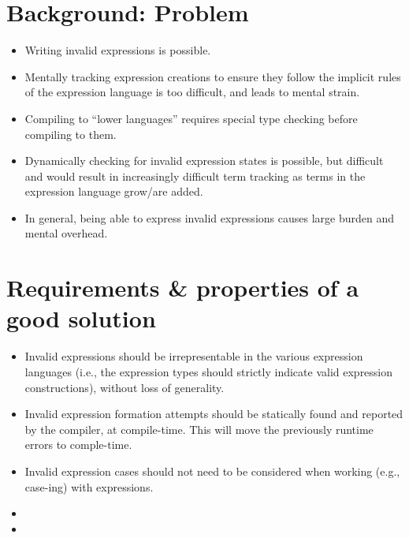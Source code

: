 \section{Background: Problem}

\begin{itemize}
    
    \item Writing invalid expressions is possible.
    
    \item Mentally tracking expression creations to ensure they follow
          the implicit rules of the expression language is too difficult,
          and leads to mental strain.

    \item Compiling to ``lower languages'' requires special type checking
          before compiling to them. 
    
    \item Dynamically checking for invalid expression states is possible,
          but difficult and would result in increasingly difficult term
          tracking as terms in the expression language grow/are added.

    \item In general, being able to express invalid expressions causes
          large burden and mental overhead.
    
\end{itemize}


\section{Requirements \& properties of a good solution}

\begin{itemize}
    
    \item Invalid expressions should be irrepresentable in the various 
          expression languages (i.e., the expression types should strictly
          indicate valid expression constructions), without loss of generality.
    
    \item Invalid expression formation attempts should be statically found
          and reported by the compiler, at compile-time. This will move the 
          previously runtime errors to comple-time.

    \item Invalid expression cases should not need to be considered when
          working (e.g., case-ing) with expressions.

    \item {}
    
    \item {}

\end{itemize}

